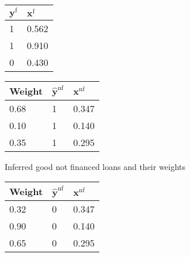 \begin{figure}
{\setlength{\parindent}{0cm}
\begin{multicols}{4}
\small

\begin{subfigure}[t]{0.22\textwidth}
\begin{center}
\begin{adjustbox}{max width=0.95\textwidth}
\begin{tabular}{l l}
\toprule
\textbf{${\bm{y}}^{\text{f}}$} & \textbf{${\bm{x}}^{\text{f}}$}\\
\midrule
1 & 0.562 \\
1 & 0.910 \\
0 & 0.430 \\
\bottomrule
\end{tabular}
\end{adjustbox}
\end{center}

\label{fuzzy:sfig1}
\end{subfigure}

\columnbreak

\begin{subfigure}[t]{0.22\textwidth}
\begin{center}
\begin{adjustbox}{max width=0.95\textwidth}
\begin{tabular}{l l l}
\toprule
\textbf{Weight} & \textbf{$\hat{\bm{y}}^{\text{nf}}$} & \textbf{${\bm{x}}^{\text{nf}}$}\\
\midrule
0.68 & 1 & 0.347 \\
0.10 & 1 & 0.140 \\
0.35 & 1 & 0.295 \\
\bottomrule
\end{tabular}
\end{adjustbox}
\end{center}

\caption{Inferred good not financed loans and their weights}
\label{fuzzy:sfig2}
\end{subfigure}

\columnbreak

\begin{subfigure}[t]{0.22\textwidth}
\begin{center}
\begin{adjustbox}{max width=0.95\textwidth}
\begin{tabular}{l l l}
\toprule
\textbf{Weight} & \textbf{$\hat{\bm{y}}^{\text{nf}}$} & \textbf{${\bm{x}}^{\text{nf}}$}\\
\midrule
0.32 & 0 & 0.347 \\
0.90 & 0 & 0.140 \\
0.65 & 0 & 0.295 \\
\bottomrule
\end{tabular}
\end{adjustbox}
\end{center}


\end{subfigure}
\end{multicols}}
\end{figure}
